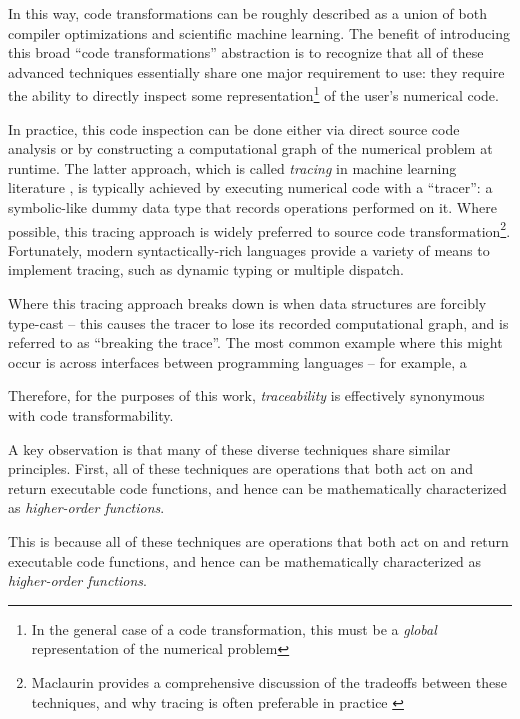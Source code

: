 
In this way, code transformations can be roughly described as a union of both compiler optimizations and scientific machine learning. The benefit of introducing this broad ``code transformations'' abstraction is to recognize that all of these advanced techniques essentially share one major requirement to use: they require the ability to directly inspect some representation\footnote{In the general case of a code transformation, this must be a \emph{global} representation of the numerical problem} of the user's numerical code.

In practice, this code inspection can be done either via direct source code analysis or by constructing a computational graph of the numerical problem at runtime. The latter approach, which is called \textit{tracing} in machine learning literature \cite{jax, frostig_compiling_2018, baydin_automatic_2018}, is typically achieved by executing numerical code with a ``tracer'': a symbolic-like dummy data type that records operations performed on it. Where possible, this tracing approach is widely preferred to source code transformation\footnote{Maclaurin provides a comprehensive discussion of the tradeoffs between these techniques, and why tracing is often preferable in practice \cite{maclaurin_modeling_2016}}. Fortunately, modern syntactically-rich languages provide a variety of means to implement tracing, such as dynamic typing or multiple dispatch.

Where this tracing approach breaks down is when data structures are forcibly type-cast -- this causes the tracer to lose its recorded computational graph, and is referred to as ``breaking the trace''. The most common example where this might occur is across interfaces between programming languages -- for example, a


Therefore, for the purposes of this work, \textit{traceability} is effectively synonymous with code transformability.


A key observation is that many of these diverse techniques share similar principles. First, all of these techniques are operations that both act on and return executable code functions, and hence can be mathematically characterized as \emph{higher-order functions}.

This is because all of these techniques are operations that both act on and return executable code functions, and hence can be mathematically characterized as \emph{higher-order functions}.

